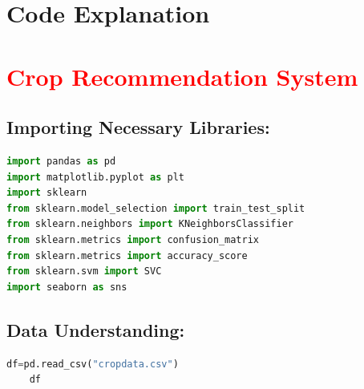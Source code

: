 \section{Code Explanation}

\section*{\textcolor{red}{Crop Recommendation System}}
\subsection{Importing Necessary Libraries:}
\begin{lstlisting}[language=Python]
import pandas as pd
import matplotlib.pyplot as plt
import sklearn
from sklearn.model_selection import train_test_split
from sklearn.neighbors import KNeighborsClassifier
from sklearn.metrics import confusion_matrix
from sklearn.metrics import accuracy_score
from sklearn.svm import SVC
import seaborn as sns


\end{lstlisting}

\subsection{Data Understanding:}
\begin{lstlisting}[language=Python]
    df=pd.read_csv("cropdata.csv")
    df
\end{lstlisting}

